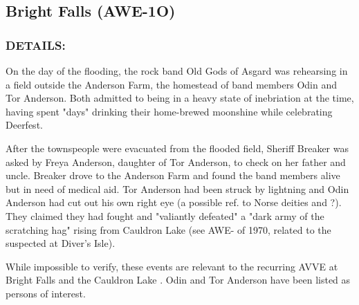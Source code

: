 \subsection*{Bright Falls (AWE-1O)}
\subsubsection*{DETAILS:}
\par On the day of the flooding, the rock band Old Gods of Asgard
was rehearsing in a field outside the Anderson Farm, the
homestead of band members Odin and Tor Anderson. Both
admitted to being in a heavy state of inebriation at the time, having
spent "days" drinking their home-brewed moonshine while
celebrating Deerfest.
\par After the townspeople were evacuated from the flooded field,
Sheriff Breaker was asked by Freya Anderson, daughter of Tor
Anderson, to check on her father and uncle. Breaker drove to the
Anderson Farm and found the band members alive but in need of
medical aid. Tor Anderson had been struck by lightning and Odin
Anderson had cut out his own right eye (a possible ref. to Norse deities
 and ?). They claimed they had fought and
"valiantly defeated" a "dark army of the scratching hag" rising from
Cauldron Lake (see AWE- of 1970, related to the suspected 
at Diver's Isle).
\par While impossible to verify, these events are relevant to the
recurring AVVE at Bright Falls and the Cauldron Lake . Odin and Tor Anderson have been listed as
persons of interest.